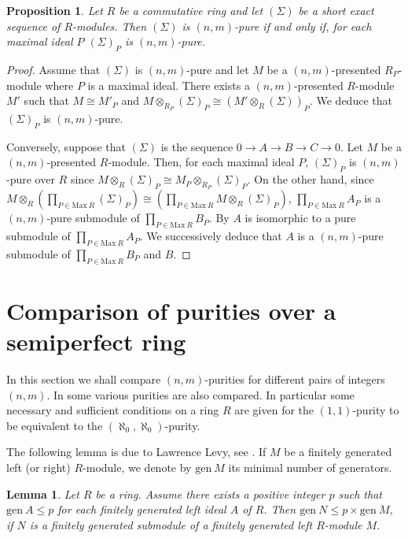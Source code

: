 \documentclass{amsart}
\newtheorem{lemma}[theorem]{Lemma}
\newtheorem{proposition}[theorem]{Proposition}
\begin{document}
\begin{proposition}
\label{P:PureLocal} Let $R$ be a commutative ring and let $(\Sigma)$ be a short exact sequence of $R$-modules. Then $(\Sigma)$ is $(n,m)$-pure if and only if, for each maximal ideal $P$ $(\Sigma)_P$ is $(n,m)$-pure.
\end{proposition}
\begin{proof}
Assume that $(\Sigma)$ is $(n,m)$-pure and let $M$ be a $(n,m)$-presented $R_P$-module where $P$ is a maximal ideal. There exists a $(n,m)$-presented $R$-module $M'$ such that $M\cong M'_P$ and $M\otimes_{R_P}(\Sigma)_P\cong (M'\otimes_R(\Sigma))_P$. We deduce that $(\Sigma)_P$ is $(n,m)$-pure.

Conversely, suppose that $(\Sigma)$ is the sequence $0\rightarrow A\rightarrow B\rightarrow C\rightarrow 0.$ Let $M$ be a $(n,m)$-presented $R$-module. Then, for each maximal ideal $P$, $(\Sigma)_P$ is $(n,m)$-pure over $R$ since $M\otimes_R(\Sigma)_P\cong M_P\otimes_{R_P}(\Sigma)_P$. On the other hand, since $M\otimes_R(\prod_{P\in\mathrm{Max}\ R}(\Sigma)_P)\cong (\prod_{P\in\mathrm{Max}\ R} M\otimes_R(\Sigma)_P)$, $\prod_{P\in\mathrm{Max}\ R}A_P$ is a $(n,m)$-pure submodule of $\prod_{P\in\mathrm{Max}\ R}B_P$. By \cite[Lemme 1.3]{Cou82} $A$ is isomorphic to a pure submodule of $\prod_{P\in\mathrm{Max}\ R}A_P$. We successively deduce that $A$ is a $(n,m)$-pure submodule of $\prod_{P\in\mathrm{Max}\ R}B_P$ and $B$.
\end{proof}

\section{Comparison of purities over a semiperfect ring}
\label{S:semiperfect}

In this section we shall compare $(n,m)$-purities for different pairs of integers $(n,m)$. In \cite{PPR99} some various purities are also compared. In particular some necessary and sufficient conditions on a ring $R$ are given for the $(1,1)$-purity to be equivalent to the $(\aleph_0,\aleph_0)$-purity.

The following lemma is due to Lawrence Levy,  see \cite[Lemma 1.3]{WiWi75}. If $M$ be a finitely generated left (or right) $R$-module, we denote by $\mathrm{gen}\ M$ its minimal number of generators.

\begin{lemma}
\label{L:Levy} Let $R$ be a ring. Assume there exists a positive integer $p$ such that $\mathrm{gen}\ A\leq p$ for each finitely generated left ideal $A$ of $R$. Then $\mathrm{gen}\ N\leq p\times\mathrm{gen}\ M$, if $N$ is a finitely generated submodule of a finitely generated left $R$-module $M$.
\end{lemma}
\end{document}

